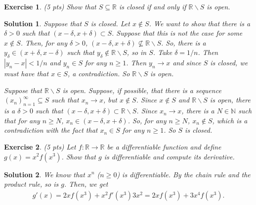\documentclass[12pt]{article}
\newcommand{\bR}{\mathbb{R}}
\newcommand{\bN}{\mathbb{N}}
\newcommand{\ra}{\rightarrow}
\theoremstyle{plain}
\newtheorem{exer}{\textbf{Exercise}}}
\theoremstyle{plain}
\newtheorem*{sol}{\textbf{Solution}}}
\theoremstyle{plain}
\theoremstyle{plain}
\begin{document}
\begin{exer}
(5 pts)
Show that $S \subseteq \bR$ is closed if and only if $\bR \backslash S$ is open.
\end{exer}
\begin{sol}
Suppose that $S$ is closed. Let $x \not\in S$. We want to show that there is a $\delta > 0$ such that $(x - \delta , x + \delta ) \subset S$. Suppose that this is not the case for some $x \not\in S$. Then, for any $\delta > 0$, $(x - \delta , x + \delta ) \nsubseteq \bR \backslash S$. So, there is a $y_{\delta} \in (x + \delta , x - \delta )$ such that $y_\delta \not\in \bR\backslash S$, so in $S$. Take $\delta = 1/n$. Then $|y_n - x| < 1/n$ and $y_n \in S$ for any $n \geq 1$. Then $y_n \ra x$ and since $S$ is closed, we must have that $x \in S$, a contradiction. So $\bR \backslash S$ is open.

Suppose that $\bR \backslash S$ is open. Suppose, if possible, that there is a sequence $(x_n)_{n =1}^\infty \subseteq S$ such that $x_n \ra x$, but $x \not\in S$. Since $x \not\in S$ and $\bR\backslash S$ is open, there is a $\delta > 0$ such that $(x - \delta , x + \delta ) \subset \bR \backslash S$. Since $x_n \ra x$, there is a $N \in \bN$ such that for any $n \geq N$, $x_n \in (x - \delta , x + \delta )$. So, for any $n \geq N$, $x_n \not\in S$, which is a contradiction with the fact that $x_n \in S$ for any $n \geq 1$. So $S$ is closed.
\end{sol}

\begin{exer}
(5 pts)
Let $f : \bR \ra \bR$ be a differentiable function and define $g(x) = x^2 f(x^3)$. Show that $g$ is differentiable and compute its derivative.
\end{exer}
\begin{sol}
We know that $x^n$ ($n \geq 0$) is differentiable. By the chain rule and the product rule, so is $g$. Then, we get
	\begin{align*}
	g'(x) = 2x f(x^3) + x^2 f'(x^3) 3x^2 = 2x f(x^3) + 3x^4 f(x^3) .
	\end{align*}
\end{sol}
\end{document}

